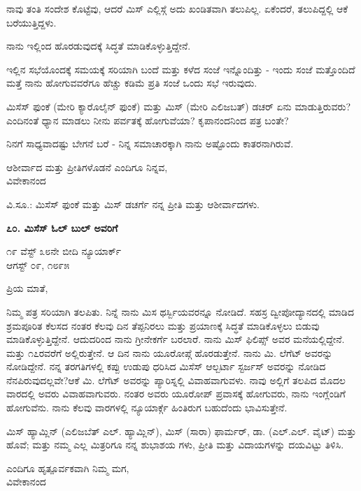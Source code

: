 ನಾವು ತಂತಿ ಸಂದೇಶ ಕೊಟ್ಟೆವು, ಆದರೆ ಮಿಸ್ ಎಲ್ಲಿಸ್ಗೆ ಅದು ಖಂಡಿತವಾಗಿ ತಲುಪಿಲ್ಲ. ಏಕೆಂದರೆ, ತಲುಪಿದ್ದಲ್ಲಿ ಆಕೆ ಬರೆಯುತ್ತಿದ್ದಳು.

ನಾನು ಇಲ್ಲಿಂದ ಹೊರಡುವುದಕ್ಕೆ ಸಿದ್ಧತೆ ಮಾಡಿಕೊಳ್ಳುತ್ತಿದ್ದೇನೆ.

ಇಲ್ಲಿನ ಸಭೆಯೊಂದಕ್ಕೆ ಸಮಯಕ್ಕೆ ಸರಿಯಾಗಿ ಬಂದೆ ಮತ್ತು ಕಳೆದ ಸಂಜೆ ಇನ್ನೊಂದಿತ್ತು - ಇಂದು ಸಂಜೆ ಮತ್ತೊಂದಿದೆ ಮತ್ತೆ ನಾನು ಹೋಗುವವರೆಗೂ ಹೆಚ್ಚು ಕಡಿಮೆ ಪ್ರತಿ ಸಂಜೆ ಒಂದು ಸಭೆ ಇರುವುದು.

ಮಿಸೆಸ್ ಫುಂಕೆ (ಮೇರಿ ಕ್ಯಾರೊಲೈನ್ ಫುಂಕೆ) ಮತ್ತು ಮಿಸ್ (ಮೇರಿ ಎಲಿಜಬತ್) ಡಚರ್ ಏನು ಮಾಡುತ್ತಿರುವರು? ಎಂದಿನಂತೆ ಧ್ಯಾನ ಮಾಡಲು ನೀನು ಪರ್ವತಕ್ಕೆ ಹೋಗುವೆಯಾ? ಕೃಪಾನಂದನಿಂದ ಪತ್ರ ಬಂತೇ?

ನಿನಗೆ ಸಾಧ್ಯವಾದಷ್ಟು ಬೇಗನೆ ಬರೆ - ನಿನ್ನ ಸಮಾಚಾರಕ್ಕಾಗಿ ನಾನು ಅಷ್ಟೊಂದು ಕಾತರನಾಗಿರುವೆ.

\begin{flushright}
ಆಶೀರ್ವಾದ ಮತ್ತು ಪ್ರೀತಿಗಳೊಡನೆ ಎಂದಿಗೂ ನಿನ್ನವ,\\ವಿವೇಕಾನಂದ
\end{flushright}

ವಿ.ಸೂ.: ಮಿಸೆಸ್ ಫುಂಕೆ ಮತ್ತು ಮಿಸ್ ಡಚರ್ಗೆ ನನ್ನ ಪ್ರೀತಿ ಮತ್ತು ಆಶೀರ್ವಾದಗಳು.

\begin{center}
\textbf{೭೦. ಮಿಸೆಸ್ ಓಲ್ ಬುಲ್ ಅವರಿಗೆ}
\end{center}

\begin{flushright}
೧೯ ವೆಸ್ಟ್ ೩೮ನೇ ಬೀದಿ ನ್ಯೂಯಾರ್ಕ್\\ಆಗಸ್ಟ್ ೦೯, ೧೮೯೫
\end{flushright}

ಪ್ರಿಯ ಮಾತೆ,

ನಿಮ್ಮ ಪತ್ರ ಸರಿಯಾಗಿ ತಲಪಿತು. ನಿನ್ನೆ ನಾನು ಮಿಸ ಥರ್ಸ್ಬಿಯವರನ್ನೂ ನೋಡಿದೆ. ಸಹಸ್ರ ದ್ವೀಪೋದ್ಯಾನದಲ್ಲಿ ಮಾಡಿದ ಶ್ರಮಪೂರಿತ ಕೆಲಸದ ನಂತರ ಕೆಲವು ದಿನ ತೆಪ್ಪನಿರಲು ಮತ್ತು ಪ್ರಯಾಣಕ್ಕೆ ಸಿದ್ಧತೆ ಮಾಡಿಕೊಳ್ಳಲು ಬಿಡುವು ಮಾಡಿಕೊಳ್ಳುತ್ತಿದ್ದೇನೆ. ಆದುದರಿಂದ ನಾನು ಗ್ರೀನೇಕರ್ಗೆ ಬರಲಾರೆ. ನಾನು ಮಿಸ್ ಫಿಲಿಪ್ಸ್ ಅವರ ಮನೆಯಲ್ಲಿದ್ದೇನೆ. ಮತ್ತು ೧೭ರವರೆಗೆ ಅಲ್ಲಿರುತ್ತೇನೆ. ಆ ದಿನ ನಾನು ಯೂರೋಪ್ಗೆ ಹೊರಡುತ್ತೇನೆ. ನಾನು ಮಿ. ಲೆಗೆಟ್ ಅವರನ್ನು ನೋಡಿದ್ದೇನೆ. ನನ್ನ ತರಗತಿಗಳಲ್ಲಿ ಕಪ್ಪು ಉಡುಪು ಧರಿಸಿದ ಮಿಸೆಸ್ ಆಲ್ಬರ್ಟಾ ಸ್ಟರ್ಜಸ್ ಅವರನ್ನು ನೋಡಿದ ನೆನಪಿರುವುದಲ್ಲವೇ?ಆಕೆ ಮಿ. ಲೆಗೆಟ್ ಅವರನ್ನು ಪ್ಯಾರಿಸ್ನಲ್ಲಿ ವಿವಾಹವಾಗುವಳು. ನಾವು ಅಲ್ಲಿಗೆ ತಲಪಿದ ಮೊದಲ ವಾರದಲ್ಲಿ ಅವರು ವಿವಾಹವಾಗುವರು. ನಂತರ ಅವರು ಯೂರೋಪ್ ಪ್ರವಾಸಕ್ಕೆ ಹೋಗುವರು, ನಾನು ಇಂಗ್ಲೆಂಡಿಗೆ ಹೋಗುವೆನು. ನಾನು ಕೆಲವು ವಾರಗಳಲ್ಲಿ ನ್ಯೂಯಾರ್ಕ್ಗೆ ಹಿಂತಿರುಗ ಬಹುದೆಂದು ಭಾವಿಸುತ್ತೇನೆ.

ಮಿಸ್ ಹ್ಯಾಮ್ಲಿನ್ (ಎಲಿಜಬೆತ್ ಎಲ್. ಹ್ಯಾಮ್ಲಿನ್), ಮಿಸ್ (ಸಾರಾ) ಫಾರ್ಮರ್, ಡಾ. (ಎಲ್.ಎಲ್. ವೈಟ್) ಮತ್ತು ಹೊವೆ; ಮತ್ತು ನಮ್ಮ ಎಲ್ಲ ಮಿತ್ರರಿಗೂ ನನ್ನ ಶುಭಾಶಯ ಗಳು, ಪ್ರೀತಿ ಮತ್ತು ವಿದಾಯಗಳನ್ನು ದಯವಿಟ್ಟು ತಿಳಿಸಿ.

\begin{flushright}
ಎಂದಿಗೂ ಹೃತ್ಪೂರ್ವಕವಾಗಿ ನಿಮ್ಮ ಮಗ,\\ವಿವೇಕಾನಂದ
\end{flushright}

